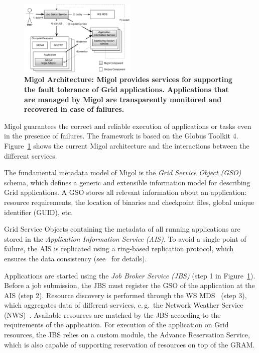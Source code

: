 \documentclass[conference,final]{IEEEtran}
\newcommand{\up}{\vspace*{-1em}}
\begin{document}
\up
\begin{figure}[h]
 \centering
 \includegraphics[width=0.5\textwidth]{migol_architecture}
 \caption{\small \bf Migol Architecture: Migol provides services for
 supporting the fault tolerance of Grid applications. Applications that are managed by
 Migol are transparently monitored and recovered in case of
 failures.\up\up
 }
 \label{fig:migol_architecture} 
\end{figure}           


Migol guarantees the correct and reliable exe\-cution of applications
or tasks even in the presence of failures. The framework is based on
the Globus Toolkit 4.  Figure~\ref{fig:migol_architecture} shows the
current Migol architecture and the interactions between the different
services.

The fundamental metadata model of Migol is the \emph{Grid Service
  Object (GSO)} schema, which defines a generic and extensible
information model for describing Grid applications.
A GSO stores all relevant information about an application: resource
requirements, the location of binaries and checkpoint files, global
unique identifier (GUID), etc.

Grid Service Objects containing the metadata of all running
applications are stored in the {\em Application Information Service
  (AIS)}.
To avoid a single point of failure, the AIS is replicated using a ring-based
replication protocol, which ensures the data consistency
(see~\cite{Luckow:2008ys} for details).

Applications are started using the {\em Job Broker Service (JBS)}
(step 1 in Figure~\ref{fig:migol_architecture}). Before a job
submission, the JBS must register the GSO of the application at the
AIS (step 2).  Resource discovery is performed through the WS
MDS~\cite{schopf06}  (step 3), which aggregates data of different services,
e.\,g.\ the Network Weather Service (NWS)~\cite{NWS99}.
Available resources are matched by the JBS according to the
requirements of the application. For execution of the application on
Grid resources, the JBS relies on a custom module, the Advance
Reservation Service, which is also capable of supporting reservation
of resources on top of the GRAM.
\end{document}
